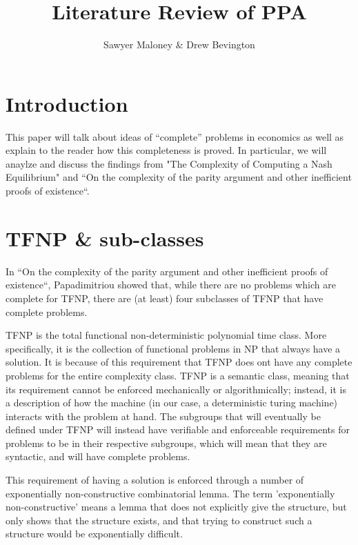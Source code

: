 \documentclass[10pt]{article}
\theoremstyle{definition}
\theoremstyle{remark}
\theoremstyle{definition}
\begin{document}
  

\author{Sawyer Maloney \& Drew Bevington}
\title{Literature Review of PPA}
\date{}

\maketitle

\pagestyle{empty}   
\thispagestyle{empty}

\section{Introduction}
This paper will talk about ideas of ``complete'' problems in economics as well as explain to the reader how
this completeness is proved. In particular, we will anaylze and discuss the findings from "The Complexity of Computing a Nash Equilibrium" and ``On the complexity of the parity argument and other inefficient proofs of existence``.

\section{TFNP \& sub-classes}

In ``On the complexity of the parity argument and other inefficient proofs of existence``, Papadimitriou showed that, while there are no problems which are complete for TFNP, there are (at least) four subclasses of TFNP that have complete problems.

TFNP is the total functional non-deterministic polynomial time class. More specifically, it is the collection of functional problems in NP that always have a solution. It is because of this requirement that TFNP does ont have any complete problems for the entire complexity class. TFNP is a semantic class, meaning that its requirement cannot be enforced mechanically or algorithmically; instead, it is a description of how the machine (in our case, a deterministic turing machine) interacts with the problem at hand. The subgroups that will eventually be defined under TFNP will instead have verifiable and enforceable requirements for problems to be in their respective subgroups, which will mean that they are syntactic, and will have complete problems.

This requirement of having a solution is enforced through a number of exponentially non-constructive combinatorial lemma. The term 'exponentially non-constructive' means a lemma that does not explicitly give the structure, but only shows that the structure exists, and that trying to construct such a structure would be exponentially difficult.
\end{document}
